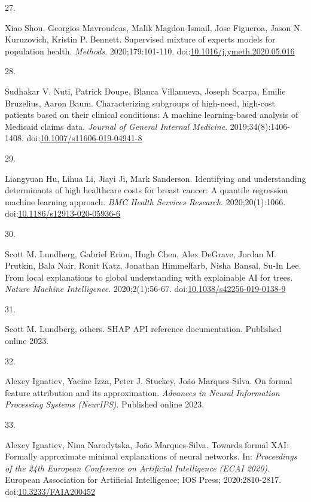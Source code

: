 \documentclass[
  12pt,
]{book}
\newlength{\cslhangindent}
\newlength{\csllabelwidth}
\newenvironment{CSLReferences}[2] %
 {\begin{list}{}{%
  \setlength{\itemindent}{0pt}
  \setlength{\leftmargin}{0pt}
  \setlength{\parsep}{0pt}
  \ifodd #1
   \setlength{\leftmargin}{\cslhangindent}
   \setlength{\itemindent}{-1\cslhangindent}
  \fi
  \setlength{\itemsep}{#2\baselineskip}}}
 {\end{list}}
\newcommand{\CSLLeftMargin}[1]{\parbox[t]{\csllabelwidth}{\strut#1\strut}}
\newcommand{\CSLRightInline}[1]{\parbox[t]{\linewidth - \csllabelwidth}{\strut#1\strut}}
\begin{document}
\begin{CSLReferences}{0}{1}
\CSLLeftMargin{27. }%
\CSLRightInline{Xiao Shou, Georgios Mavroudeas, Malik Magdon-Ismail,
Jose Figueroa, Jason N. Kuruzovich, Kristin P. Bennett. Supervised
mixture of experts models for population health. \emph{Methods}.
2020;179:101-110.
doi:\href{https://doi.org/10.1016/j.ymeth.2020.05.016}{10.1016/j.ymeth.2020.05.016}}

\CSLLeftMargin{28. }%
\CSLRightInline{Sudhakar V. Nuti, Patrick Doupe, Blanca Villanueva,
Joseph Scarpa, Emilie Bruzelius, Aaron Baum. Characterizing subgroups of
high-need, high-cost patients based on their clinical conditions: A
machine learning-based analysis of {Medicaid} claims data. \emph{Journal
of General Internal Medicine}. 2019;34(8):1406-1408.
doi:\href{https://doi.org/10.1007/s11606-019-04941-8}{10.1007/s11606-019-04941-8}}

\CSLLeftMargin{29. }%
\CSLRightInline{Liangyuan Hu, Lihua Li, Jiayi Ji, Mark Sanderson.
Identifying and understanding determinants of high healthcare costs for
breast cancer: A quantile regression machine learning approach.
\emph{BMC Health Services Research}. 2020;20(1):1066.
doi:\href{https://doi.org/10.1186/s12913-020-05936-6}{10.1186/s12913-020-05936-6}}

\CSLLeftMargin{30. }%
\CSLRightInline{Scott M. Lundberg, Gabriel Erion, Hugh Chen, Alex
DeGrave, Jordan M. Prutkin, Bala Nair, Ronit Katz, Jonathan Himmelfarb,
Nisha Bansal, Su-In Lee. From local explanations to global understanding
with explainable {AI} for trees. \emph{Nature Machine Intelligence}.
2020;2(1):56-67.
doi:\href{https://doi.org/10.1038/s42256-019-0138-9}{10.1038/s42256-019-0138-9}}

\CSLLeftMargin{31. }%
\CSLRightInline{Scott M. Lundberg, others. {SHAP} {API} reference
documentation. Published online 2023.}

\CSLLeftMargin{32. }%
\CSLRightInline{Alexey Ignatiev, Yacine Izza, Peter J. Stuckey, João
Marques-Silva. On formal feature attribution and its approximation.
\emph{Advances in Neural Information Processing Systems (NeurIPS)}.
Published online 2023.}

\CSLLeftMargin{33. }%
\CSLRightInline{Alexey Ignatiev, Nina Narodytska, João Marques-Silva.
Towards formal {XAI}: Formally approximate minimal explanations of
neural networks. In: \emph{Proceedings of the 24th European Conference
on Artificial Intelligence ({ECAI} 2020)}. European Association for
Artificial Intelligence; IOS Press; 2020:2810-2817.
doi:\href{https://doi.org/10.3233/FAIA200452}{10.3233/FAIA200452}}


\end{CSLReferences}
\end{document}

